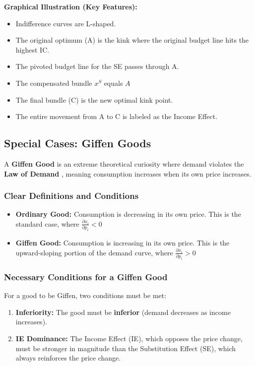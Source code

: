 \documentclass{article}
\begin{document}
\textbf{Graphical Illustration (Key Features):}
\begin{itemize}
    \item Indifference curves are L-shaped.
    \item The original optimum (A) is the kink where the original budget line hits the highest IC.
    \item The pivoted budget line for the SE passes through A.
    \item The compensated bundle $x^S$ equals $A$
    \item The final bundle (C) is the new optimal kink point.
    \item The entire movement from A to C is labeled as the Income Effect.
\end{itemize}

\subsection{Special Cases: Giffen Goods}

A \textbf{Giffen Good} is an extreme theoretical curiosity where demand violates the \textbf{Law of Demand} , meaning consumption increases when its own price increases.

\subsubsection*{Clear Definitions and Conditions}
\begin{itemize}
    \item \textbf{Ordinary Good:} Consumption is decreasing in its own price. This is the standard case, where $\frac{\partial x_i}{\partial p_i} < 0$
    \item \textbf{Giffen Good:} Consumption is increasing in its own price. This is the upward-sloping portion of the demand curve, where $\frac{\partial x_i}{\partial p_i} > 0$
\end{itemize}

\subsubsection*{Necessary Conditions for a Giffen Good}
For a good to be Giffen, two conditions must be met:
\begin{enumerate}
    \item \textbf{Inferiority:} The good must be \textbf{inferior} (demand decreases as income increases).
    \item \textbf{IE Dominance:} The Income Effect (IE), which opposes the price change, must be stronger in magnitude than the Substitution Effect (SE), which always reinforces the price change.
\end{enumerate}
\end{document}
